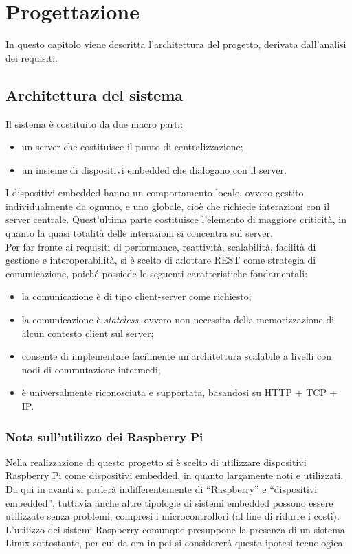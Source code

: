 \chapter{Progettazione}

In questo capitolo viene descritta l'architettura del progetto, derivata dall'analisi dei requisiti.

\section{Architettura del sistema \label{arch}}
Il sistema è costituito da due macro parti:
\begin{itemize}
 \item un server che costituisce il punto di centralizzazione;
 \item un insieme di dispositivi embedded che dialogano con il server.
\end{itemize}
I dispositivi embedded hanno un comportamento locale, ovvero gestito individualmente da ognuno, e uno globale, cioè che richiede interazioni con il server centrale.
Quest'ultima parte costituisce l'elemento di maggiore criticità, in quanto la quasi totalità delle interazioni si concentra sul server.
\\Per far fronte ai requisiti di performance, reattività, scalabilità, facilità di gestione e interoperabilità, si è scelto di adottare REST come strategia di comunicazione, poiché possiede le seguenti caratteristiche fondamentali:
\begin{itemize}
 \item la comunicazione è di tipo client-server come richiesto;
 \item la comunicazione è \textit{stateless}, ovvero non necessita della memorizzazione di alcun contesto client sul server;
 \item consente di implementare facilmente un'architettura scalabile a livelli con nodi di commutazione intermedi;
 \item è universalmente riconosciuta e supportata, basandosi su HTTP + TCP + IP.
\end{itemize}
\subsection{Nota sull'utilizzo dei Raspberry Pi}
Nella realizzazione di questo progetto si è scelto di utilizzare dispositivi Raspberry Pi come dispositivi embedded, in quanto largamente noti e utilizzati.
Da qui in avanti si parlerà indifferentemente di ``Raspberry'' e ``dispositivi embedded'', tuttavia anche altre tipologie di sistemi embedded possono essere utilizzate senza problemi, compresi i microcontrollori (al fine di ridurre i costi).
L'utilizzo dei sistemi Raspberry comunque presuppone la presenza di un sistema Linux sottostante, per cui da ora in poi si considererà questa ipotesi tecnologica.


